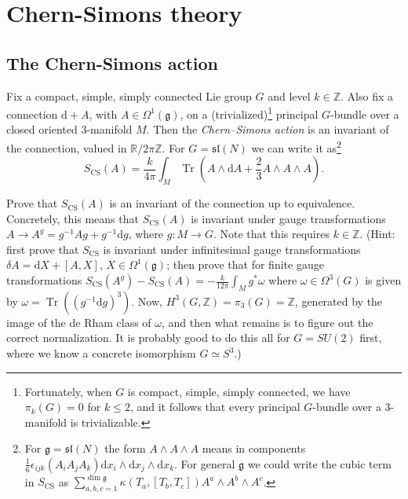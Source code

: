 \documentclass[12pt,letterpaper,reqno]{amsart}
\numberwithin{equation}{section}
\newcommand{\fg}{{\mathfrak g}}
\newcommand{\fsl}{{\mathfrak {sl}}}
\newcommand{\bbR}{\ensuremath{\mathbb R}}
\newcommand{\bbZ}{\ensuremath{\mathbb Z}}
\newcommand{\de}{\mathrm{d}}
\newcommand{\eps}{\epsilon}
\newcommand{\CS}{\textrm{CS}}
\newcommand{\ti}[1]{\textit{#1}}
\DeclareMathOperator{\Tr}{Tr}
\DeclareRobustCommand{\fixme}[1]{\leavevmode{\color{orange}[#1]}}
\begin{document}


\section{Chern-Simons theory}

\subsection{The Chern-Simons action}

Fix a compact, simple, simply connected Lie group $G$ and 
level $k\in \mathbb Z$. Also fix a 
connection $\de + A$, with $A \in \Omega^1(\fg)$,
on a (trivialized)\footnote{Fortunately, when $G$ is compact,
simple, simply connected, we have $\pi_k(G) = 0$ for $k \le 2$, 
and it follows that every principal $G$-bundle over a $3$-manifold is trivializable.}
principal $G$-bundle over a closed oriented 
$3$-manifold $M$. Then the \ti{Chern--Simons action} is an invariant
of the connection, valued in $\bbR / 2 \pi \bbZ$.
For $G = \fsl(N)$ we can write it as\footnote{For $\fg = \fsl(N)$ 
the form $A \wedge A \wedge A$ means in components
$\frac16 \eps_{ijk} (A_i A_j A_k) \de x_i \wedge \de x_j \wedge \de x_k$. For general $\fg$ we could write
the cubic term in $S_\CS$ as $\sum_{a,b,c=1}^{\dim \fg} \kappa(T_a, [T_b, T_c]) A^a \wedge A^b \wedge A^c$.}
\[
S_{\mathrm{CS}}(A)
=
\frac{k}{4\pi} \int_M \Tr \left(
A\wedge \de A + \frac23 A \wedge A \wedge A
\right).
\]
\begin{exercise}
Prove that $S_\CS(A)$ is an invariant of the connection up to equivalence. 
Concretely, this means that $S_\CS(A)$ is invariant under gauge transformations
$A \to A^g = g^{-1} A g + g^{-1} \de g$, where $g: M \to G$.
Note that this requires $k \in \bbZ$.
(Hint: first prove that $S_\CS$ is invariant under 
infinitesimal gauge
transformations $\delta A = \de X + [A,X]$,
$X \in \Omega^1(\fg)$;
then prove that for finite gauge transformations
$S_\CS(A^g) - S_\CS(A) = -\frac{k}{12 \pi} \int_M g^* \omega$
where $\omega \in \Omega^3(G)$ is given by $\omega = \Tr ((g^{-1} \de g)^3)$.
Now, $H^3(G,\bbZ) = \pi_3(G) = \bbZ$, generated by the image of the de Rham 
class of $\omega$, and then what remains 
is to figure out the correct normalization. It is probably good to do this all
for $G = SU(2)$ first, where we know a concrete isomorphism $G \simeq S^3$.)
\end{exercise}
\end{document}

